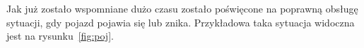 \documentclass[11pt, a4paper]{article}
\begin{document}
Jak już zostało wspomniane dużo czasu zostało poświęcone na poprawną obsługę sytuacji, gdy pojazd pojawia się lub znika. Przykładowa taka sytuacja widoczna jest na rysunku~\ref{fig:poj}.
\begin{figure}[htbp!]
	\centering
	
	\hfill%
	\hfill%
	

\end{figure}
\end{document}
